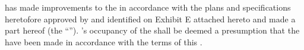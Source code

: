 \lessor has made improvements to the \premises in accordance with the plans and specifications heretofore approved by \lessee and identified on Exhibit E attached hereto and made a part hereof (the ``''). \lessee's occupancy of the \premises shall be deemed a presumption that the \premisesImprovements have been made in accordance with the terms of this \lease.
